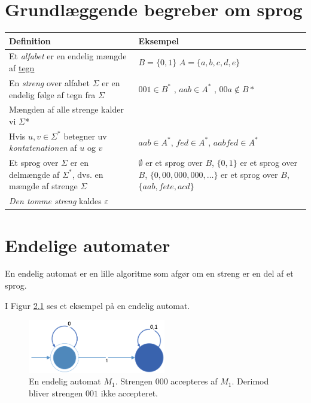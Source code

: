 \documentclass[a4paper,10pt,article]{memoir}
\begin{document}
\chapter{Grundlæggende begreber om sprog}

\begin{tabular}{| p{5cm} | p{5cm} |}
    \hline
    Definition & Eksempel \\ \hline
    Et \emph{alfabet} er en endelig mængde af \underline{tegn} & $B=\{0,1\}$ $A=\{a,b,c,d,e\}$ \\ \hline
    En \emph{streng} over alfabet $\Sigma$ er en endelig følge af tegn fra $\Sigma$ & $001 \in B^*$ , $aab \in A^*$ , $00a  \not \in  B*$  \\ \hline
    Mængden af alle strenge kalder vi $ \Sigma $* & \\ \hline
    Hvis $u,v \in \Sigma^{\ast}$ betegner uv \emph{kontatenationen} af $u$ og $v$ & $aab \in A^*$, $fed \in A^*$, $aabfed \in A^*$ \\ \hline
    Et sprog over $\Sigma$ er en delmængde af $\Sigma^{\ast}$, dvs. en
    mængde af strenge $\Sigma$ & $\emptyset$ er et sprog over $B$,
    $\{0,1\}$ er et sprog over $B$, $\{0,00,000,000, \ldots \}$ er et sprog over $B$, $\{aab, fete, acd\}$ \\ \hline
    \emph{Den tomme streng} kaldes $\varepsilon$ & \\ \hline
  \end{tabular}

\chapter{Endelige automater}

  
En endelig automat er en lille algoritme som afgør om en streng er en
del af et sprog. 

\begin{eksempel} \label{eks:e1}

I Figur \ref{fig:m1} ses et eksempel på en endelig automat. 

\begin{figure}
  \begin{center}
    \includegraphics[width=60mm]{fig1.PNG} 
  \end{center}
\caption{En endelig automat $M_1$. Strengen $000$ accepteres af
  $M_1$. Derimod bliver strengen $001$ ikke accepteret.}
\label{fig:m1}
\end{figure}
\end{eksempel}
\end{document}
